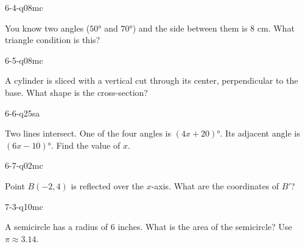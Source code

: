 \begin{practiceQuestion}{6-4-q08}{mc}
\begin{questionText}
You know two angles ($50°$ and $70°$) and the side between them is $8$ cm. What triangle condition is this?
\end{questionText}
\end{practiceQuestion}

\begin{practiceQuestion}{6-5-q08}{mc}
\begin{questionText}
A cylinder is sliced with a vertical cut through its center, perpendicular to the base. What shape is the cross-section?
\end{questionText}
\end{practiceQuestion}

\begin{practiceQuestion}{6-6-q25}{sa}
\begin{questionText}
Two lines intersect. One of the four angles is $(4x + 20)°$. Its adjacent angle is $(6x - 10)°$. Find the value of $x$.
\end{questionText}
\end{practiceQuestion}

\begin{practiceQuestion}{6-7-q02}{mc}
\begin{questionText}
Point $B(-2, 4)$ is reflected over the $x$-axis. What are the coordinates of $B'$?
\end{questionText}
\end{practiceQuestion}

\begin{practiceQuestion}{7-3-q10}{mc}
\begin{questionText}
A semicircle has a radius of $6$ inches. What is the area of the semicircle? Use $\pi \approx 3.14$.
\end{questionText}
\end{practiceQuestion}

